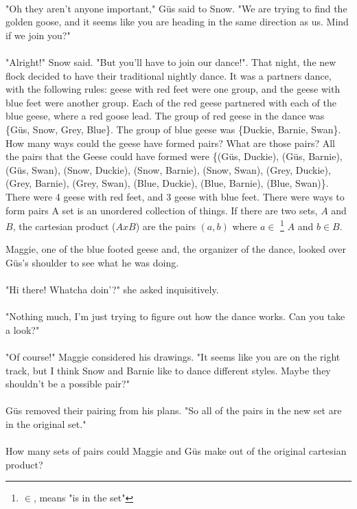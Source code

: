 \paragraph{} "Oh they aren't anyone important," G{\"u}s said to Snow. "We are trying to find the golden goose, and it seems like you are heading in the same direction as us. Mind if we join you?"
\paragraph{} "Alright!" Snow said. "But you'll have to join our dance!".
\vfill
\pagebreak
{}
{That night, the new flock decided to have their traditional nightly dance. It was a partners dance, with the following rules: geese with red feet were one group, and the geese with blue feet were another group. Each of the red geese partnered with each of the blue geese, where a red goose lead. The group of red geese in the dance was \{G{\"u}s, Snow, Grey, Blue\}. The group of blue geese was \{Duckie, Barnie, Swan\}. How many ways could the geese have formed pairs? What are those pairs?}
{All the pairs that the Geese could have formed were \{(G{\"u}s, Duckie), (G{\"u}s, Barnie), (G{\"u}s, Swan), (Snow, Duckie), (Snow, Barnie), (Snow, Swan), (Grey, Duckie), (Grey, Barnie), (Grey, Swan), (Blue, Duckie), (Blue, Barnie), (Blue, Swan)\}. There were 4 geese with red feet, and 3 geese with blue feet. There were  ways to form pairs}
{A set is an unordered collection of things. If there are two sets, $A$ and $B$, the cartesian product ($AxB$) are the pairs $(a, b)$ where $a\in$ \footnote{$\in$, means "is in the set"} $A$ and $b\in B$.}
{}
{Maggie, one of the blue footed geese and, the organizer of the dance, looked over G{\"u}s's shoulder to see what he was doing. \paragraph{} "Hi there! Whatcha doin'?" she asked inquisitively.
\paragraph{} "Nothing much, I'm just trying to figure out how the dance works. Can you take a look?"
\paragraph{} "Of course!" Maggie considered his drawings. "It seems like you are on the right track, but I think Snow and Barnie like to dance different styles. Maybe they shouldn't be a possible pair?"
\paragraph{} G{\"u}s removed their pairing from his plans. "So all of the pairs in the new set are in the original set."
\paragraph{} How many sets of pairs could Maggie and G{\"u}s make out of the original cartesian product?}
